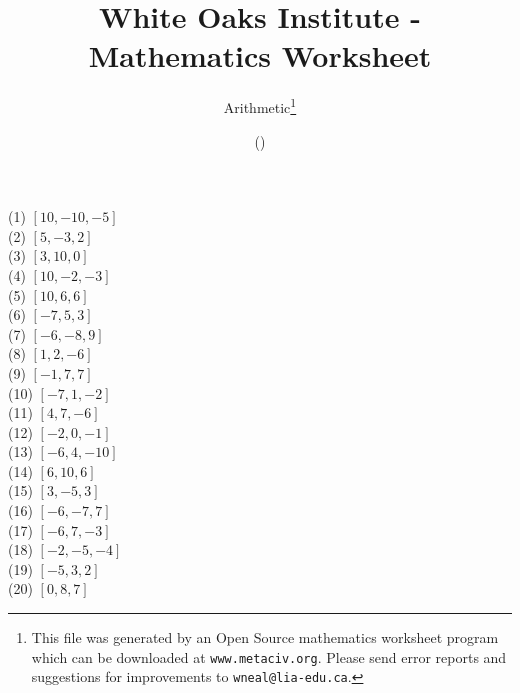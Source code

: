 \documentclass[letter]{article}
\begin{document}
\title{White Oaks Institute - Mathematics Worksheet}
\author{Arithmetic\thanks{This file was generated by an \textsf{Open Source} mathematics worksheet program which can be downloaded at \texttt{www.metaciv.org}. Please send error reports and suggestions for improvements to \texttt{wneal@lia-edu.ca}.}}
\date{\XCfileversion{} (\XCfiledate)}
\maketitle
\begin{multicols}{2}(1) $[10, -10, -5]$\\(2) $[5, -3, 2]$\\(3) $[3, 10, 0]$\\(4) $[10, -2, -3]$\\(5) $[10, 6, 6]$\\(6) $[-7, 5, 3]$\\(7) $[-6, -8, 9]$\\(8) $[1, 2, -6]$\\(9) $[-1, 7, 7]$\\(10) $[-7, 1, -2]$\\(11) $[4, 7, -6]$\\(12) $[-2, 0, -1]$\\(13) $[-6, 4, -10]$\\(14) $[6, 10, 6]$\\(15) $[3, -5, 3]$\\(16) $[-6, -7, 7]$\\(17) $[-6, 7, -3]$\\(18) $[-2, -5, -4]$\\(19) $[-5, 3, 2]$\\(20) $[0, 8, 7]$\end{multicols}
\end{document}
